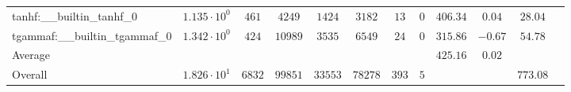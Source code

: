 \begin{tabular}{|l|c|c|c|c|c|c|c|c|c|c|c|}
tanhf:\_\_builtin\_tanhf\_0               & $ 1.135 \cdot 10^{0}  $ & $ 461    $ & $ 4249  $ & $ 1424  $ & $ 3182  $ & $ 13  $ & $ 0 $ & $ 406.34      $ & $ 0.04    $ & $ 28.04   $ \\
tgammaf:\_\_builtin\_tgammaf\_0           & $ 1.342 \cdot 10^{0}  $ & $ 424    $ & $ 10989 $ & $ 3535  $ & $ 6549  $ & $ 24  $ & $ 0 $ & $ 315.86      $ & $ -0.67   $ & $ 54.78   $ \\
\hline
Average                                   & $                     $ & $        $ & $       $ & $       $ & $       $ & $     $ & $   $ & $ 425.16      $ & $ 0.02    $ & $         $ \\
\hline
Overall                                   & $ 1.826 \cdot 10^{1}  $ & $ 6832   $ & $ 99851 $ & $ 33553 $ & $ 78278 $ & $ 393 $ & $ 5 $ & $             $ & $         $ & $ 773.08  $ \\
\hline
\end{tabular}
